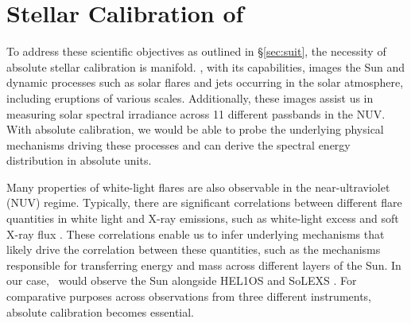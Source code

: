 
\section{Stellar Calibration of  {\suit}}\label{sec:stellar_calib}

To address these scientific objectives as outlined in \S\ref{sec:suit}, the necessity of absolute stellar calibration is manifold. \suit, with its capabilities, images the Sun and dynamic processes such as solar flares and jets occurring in the solar atmosphere, including eruptions of various scales. Additionally, these images assist us in measuring solar spectral irradiance across 11 different passbands in the NUV. With absolute calibration, we would be able to probe the underlying physical mechanisms driving these processes and can derive the spectral energy distribution in absolute units.

Many properties of white-light flares are also observable in the near-ultraviolet (NUV) regime. Typically, there are significant correlations between different flare quantities in white light and X-ray emissions, such as white-light excess and soft X-ray flux \citep{benz16,hudson16}. These correlations enable us to infer underlying mechanisms that likely drive the correlation between these quantities, such as the mechanisms responsible for transferring energy and mass across different layers of the Sun. In our case, \suit~would observe the Sun alongside HEL1OS and SoLEXS \citep{solexs}. For comparative purposes across observations from three different instruments, absolute calibration becomes essential.

